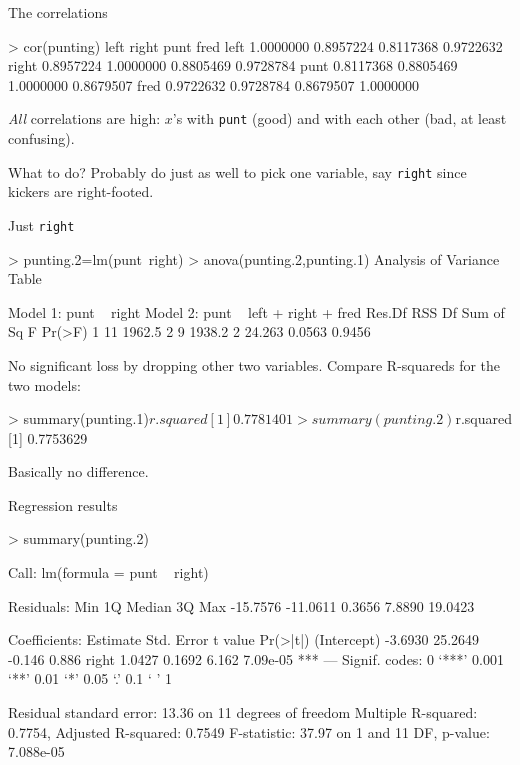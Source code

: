 \begin{frame}[fragile]{The correlations}  


{\scriptsize
\begin{semiverbatim}
> cor(punting)
           left     right      punt      fred
left  1.0000000 0.8957224 0.8117368 0.9722632
right 0.8957224 1.0000000 0.8805469 0.9728784
punt  0.8117368 0.8805469 1.0000000 0.8679507
fred  0.9722632 0.9728784 0.8679507 1.0000000
\end{semiverbatim}
}

{\em All} correlations are high: $x$'s with \verb-punt- (good) and
with each other (bad, at least confusing).

What to do? Probably do just as well to pick one variable, say
\texttt{right} since kickers are right-footed.

\end{frame}

\begin{frame}[fragile]{Just \texttt{right}}

{\scriptsize
\begin{semiverbatim}
> punting.2=lm(punt~right)
> anova(punting.2,punting.1)
Analysis of Variance Table

Model 1: punt ~ right
Model 2: punt ~ left + right + fred
  Res.Df    RSS Df Sum of Sq      F Pr(>F)
1     11 1962.5                           
2      9 1938.2  2    24.263 0.0563 0.9456
\end{semiverbatim}
}

No significant loss by dropping other two variables.
Compare R-squareds for the two models:

{\scriptsize
  \begin{semiverbatim}
> summary(punting.1)$r.squared
[1] 0.7781401
> summary(punting.2)$r.squared
[1] 0.7753629    
  \end{semiverbatim}
}

Basically no difference.
  
\end{frame}

\begin{frame}[fragile]{Regression results}
  
{\scriptsize
  \begin{semiverbatim}
> summary(punting.2)

Call:
lm(formula = punt ~ right)

Residuals:
     Min       1Q   Median       3Q      Max 
-15.7576 -11.0611   0.3656   7.8890  19.0423 

Coefficients:
            Estimate Std. Error t value Pr(>|t|)    
(Intercept)  -3.6930    25.2649  -0.146    0.886    
right         1.0427     0.1692   6.162 7.09e-05 ***
---
Signif. codes:  0 ‘***’ 0.001 ‘**’ 0.01 ‘*’ 0.05 ‘.’ 0.1 ‘ ’ 1 

Residual standard error: 13.36 on 11 degrees of freedom
Multiple R-squared: 0.7754,	Adjusted R-squared: 0.7549 
F-statistic: 37.97 on 1 and 11 DF,  p-value: 7.088e-05 
    
  \end{semiverbatim}
}
\end{frame}

